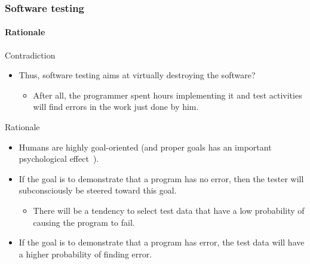 \begin{frame}
\frametitle{Software testing}
\framesubtitle{Rationale}

\begin{block:fact}{Contradiction}
\begin{itemize}
	\item Thus, software testing aims at virtually destroying the software?
	\begin{itemize}
		\item After all, the programmer spent hours implementing it and
		test activities will find errors in the work just done by him.
	\end{itemize}
\end{itemize}
\end{block:fact}

\begin{block:fact}{Rationale}
\begin{itemize}
	\item Humans are highly goal-oriented (and proper goals has an important
	psychological effect~\cite[p. 6]{myers:2004}).

	\item If the goal is to demonstrate that a program has no error, then the
	tester will subconsciously be steered toward this goal.
	\begin{itemize}
		\item There will be a tendency to select test data that have a low
		probability of causing the program to fail.
	\end{itemize}

	\item If the goal is to demonstrate that a program has error, the test data
	will have a higher probability of finding error.
\end{itemize}
\end{block:fact}
\end{frame}



